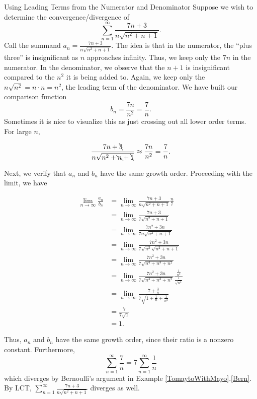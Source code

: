 \begin{example}{Using Leading Terms from the Numerator and Denominator}
Suppose we wish to determine the convergence/divergence of  $$\sum_{n=1}^\infty  \frac{7n+3}{n\sqrt{n^2+n+1}}.$$
Call the summand $a_n=\frac{7n+3}{n\sqrt{n^2+n+1}}$.  The idea is that in the numerator, the ``plus three'' is insignificant as $n$ approaches infinity.  Thus, we keep only the $7n$ in the numerator.  In the denominator, we observe that the $n+1$ is insignificant compared to the $n^2$ it is being added to.  Again, we keep only the $n\sqrt{n^2}=n\cdot n = n^2$, the leading term of the denominator.  We have built our comparison function $$b_n=\frac{7n}{n^2}=\frac{7}{n}.$$  Sometimes it is nice to visualize this as just crossing out all lower order terms.  For large $n$, 

$$\frac{7n+\bcancel{3}}{n\sqrt{n^2+\bcancel{n}+\bcancel{1}}}\approx\frac{7n}{n^2}=\frac{7}{n}. $$

Next, we verify that $a_n$ and $b_n$ have the same growth order.  Proceeding with the limit, we have

\begin{align*}
\lim_{n \rightarrow \infty}\frac{a_n}{b_n}&=\lim_{n \rightarrow \infty}\frac{7n+3}{n\sqrt{n^2+n+1}}\frac{n}{7} \\
&=\lim_{n \rightarrow \infty}\frac{7n+3}{7\sqrt{n^2+n+1}} \\
&=\lim_{n \rightarrow \infty}\frac{7n^2+3n}{7n\sqrt{n^2+n+1}} \\
&=\lim_{n \rightarrow \infty}\frac{7n^2+3n}{7\sqrt{n^2}\sqrt{n^2+n+1}} \\
&=\lim_{n \rightarrow \infty}\frac{7n^2+3n}{7\sqrt{n^4+n^3+n^2}} \\
&=\lim_{n \rightarrow \infty}\frac{7n^2+3n}{7\sqrt{n^4+n^3+n^2}}\frac{\frac{1}{n^2}}{\frac{1}{\sqrt{n^4}}} \\
&=\lim_{n \rightarrow \infty}\frac{7+\frac{3}{n}}{7\sqrt{1+\frac{1}{n}+\frac{1}{n^2}}} \\
&=\frac{7}{7\sqrt{1}}\\
&=1.
\end{align*}

Thus, $a_n$ and $b_n$ have the same growth order, since their ratio is a nonzero constant. Furthermore, $$\sum_{n=1}^\infty \frac{7}{n}=7\sum_{n=1}^\infty \frac{1}{n}$$ which diverges by Bernoulli's argument in Example \ref{TomaytoWithMayo}.\ref{Bern}.   By LCT, $\sum_{n=1}^\infty  \frac{7n+3}{n\sqrt{n^2+n+1}}$ diverges as well.
\end{example}

